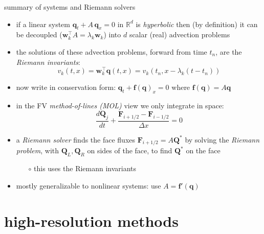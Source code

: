 \documentclass[10pt,hyperref,dvipsnames]{beamer}
\newcommand{\bbf}{\mathbf{f}}
\newcommand{\bq}{\mathbf{q}}
\newcommand{\bw}{\mathbf{w}}
\newcommand{\bF}{\mathbf{F}}
\newcommand{\bQ}{\mathbf{Q}}
\newcommand{\RR}{\mathbb{R}}
\begin{document}
\begin{frame}{summary of systems and Riemann solvers}

\begin{itemize}
\item if a linear system $\bq_t + A\, \bq_x=0$ in $\RR^d$ is \alert{\emph{hyperbolic}} then (by definition) it can be decoupled ($\bw_k^\top A = \lambda_k \bw_k$) into $d$ scalar (real) advection problems
\item the solutions of these advection problems, forward from time $t_n$, are the \alert{\emph{Riemann invariants}}:
    $$v_k(t,x) = \bw_k^\top \bq(t,x) = v_k(t_n,x-\lambda_k (t-t_n))$$
\item now write in conservation form: $\bq_t + \bbf(\bq)_x=0$ where $\bbf(\bq) = A\bq$
\item in the FV \alert{\emph{method-of-lines (MOL)}} view we only integrate in space:
    $$\frac{d\bQ_j}{dt} + \frac{\bF_{i+1/2} - \bF_{i-1/2}}{\Delta x} = 0$$
\item a \alert{\emph{Riemann solver}} finds the face fluxes $\bF_{i+1/2}=A \bQ^*$ by solving the \emph{Riemann problem}, with $\bQ_L,\bQ_R$ on sides of the face, to find $\bQ^*$ on the face
    \begin{itemize}
    \item[$\circ$] this uses the Riemann invariants
    \end{itemize}
\item mostly generalizable to nonlinear systems: use $A=\bbf'(\bq)$
\end{itemize}
\end{frame}


\section{high-resolution methods}
\end{document}

